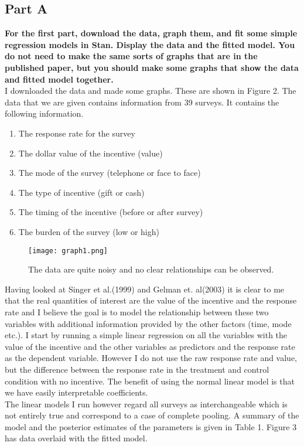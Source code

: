 \documentclass{article}
\begin{document}
\subsection{Part A}
\textbf{For the first part, download the data, graph them, and fit some simple regression models in Stan. Display the data and the fitted model. You do not need to make the same sorts of graphs that are in the published paper, but you should make some graphs that show the data and fitted model together.}\\
I downloaded the data and made some graphs. These are shown in Figure 2. The data that we are given contains information from 39 surveys. It contains the following information.
\begin{enumerate}
\item{The response rate for the survey}
\item{The dollar value of the incentive (value)}
\item{The mode of the survey (telephone or face to face)}
\item{The type of incentive (gift or cash)}
\item{The timing of the incentive (before or after survey)}
\item{The burden of the survey (low or high)}
\end{enumerate}
 \begin{figure}[H]
\centering
\texttt{[image: graph1.png]}
\caption{The data are quite noisy and no clear relationships can be observed.}
\label{deltat}
\end{figure}
Having looked at Singer et al.(1999) and Gelman et. al(2003) it is clear to me that the real quantities of interest are the value of the incentive and the response rate and I believe the goal is to model the relationship between these two variables with additional information provided by the other factors (time, mode etc.). I start by running a simple linear regression on all the variables with the value of the incentive and the other variables as predictors and the response rate as the dependent variable. However I do not use the raw response rate and value, but the difference between the response rate in the treatment and control condition with no incentive. The benefit of using the normal linear model is that we have easily interpretable coefficients.\\ 
The linear models I run however regard all surveys as interchangeable which is not entirely true and correspond to a case of complete pooling. A summary of the model and the posterior estimates of the parameters is given in Table 1. Figure 3 has data overlaid with the fitted model.
\end{document}
